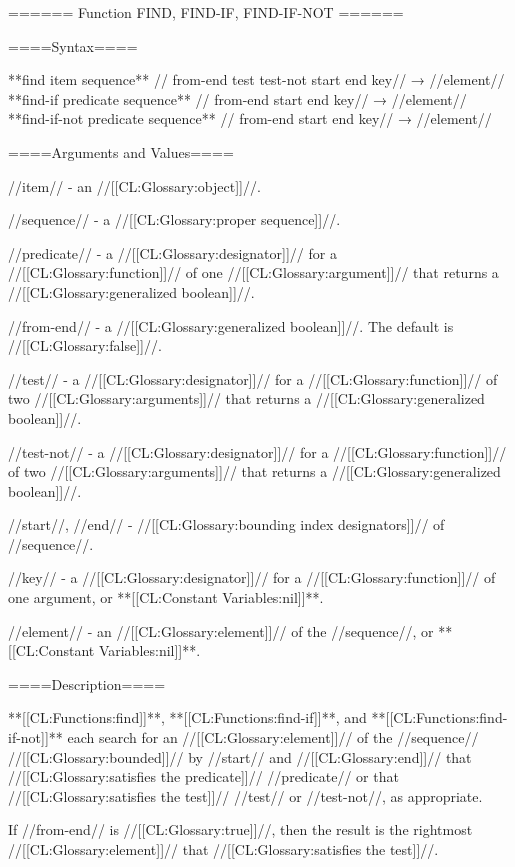 ====== Function FIND, FIND-IF, FIND-IF-NOT ======

====Syntax====

**find {item sequence** //\key} from-end test test-not start end key// → //element// **find-if {predicate sequence** //\key} from-end start end key// → //element// **find-if-not {predicate sequence** //\key} from-end start end key// → //element//

====Arguments and Values====

//item// - an //[[CL:Glossary:object]]//.

//sequence// - a //[[CL:Glossary:proper sequence]]//.

//predicate// - a //[[CL:Glossary:designator]]// for a //[[CL:Glossary:function]]// of one //[[CL:Glossary:argument]]// that returns a //[[CL:Glossary:generalized boolean]]//.

//from-end// - a //[[CL:Glossary:generalized boolean]]//. The default is //[[CL:Glossary:false]]//.

//test// - a //[[CL:Glossary:designator]]// for a //[[CL:Glossary:function]]// of two //[[CL:Glossary:arguments]]// that returns a //[[CL:Glossary:generalized boolean]]//.

//test-not// - a //[[CL:Glossary:designator]]// for a //[[CL:Glossary:function]]// of two //[[CL:Glossary:arguments]]// that returns a //[[CL:Glossary:generalized boolean]]//.

//start//, //end// - //[[CL:Glossary:bounding index designators]]// of //sequence//. 

//key// - a //[[CL:Glossary:designator]]// for a //[[CL:Glossary:function]]// of one argument, or **[[CL:Constant Variables:nil]]**.

//element// - an //[[CL:Glossary:element]]// of the //sequence//, or **[[CL:Constant Variables:nil]]**.

====Description====

**[[CL:Functions:find]]**, **[[CL:Functions:find-if]]**, and **[[CL:Functions:find-if-not]]** each search for an //[[CL:Glossary:element]]// of the //sequence// //[[CL:Glossary:bounded]]// by //start// and //[[CL:Glossary:end]]// that //[[CL:Glossary:satisfies the predicate]]// //predicate// or that //[[CL:Glossary:satisfies the test]]// //test// or //test-not//, as appropriate.


If //from-end// is //[[CL:Glossary:true]]//, then the result is the rightmost //[[CL:Glossary:element]]// that //[[CL:Glossary:satisfies the test]]//.

